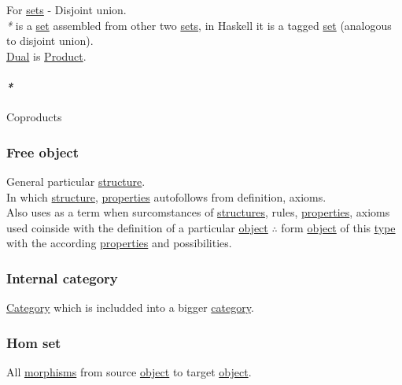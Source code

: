 \documentclass[11pt]{article}
\begin{document}
For \hyperref[org58ec608]{sets} - Disjoint union.\\

\emph{*} is a \hyperref[org1faf06d]{set} assembled from other two \hyperref[org58ec608]{sets}, in Haskell it is a tagged \hyperref[org1faf06d]{set} (analogous to disjoint union).\\

\hyperref[org28cefbe]{Dual} is \hyperref[org80a0b6e]{Product}.\\

\paragraph{\emph{*}}
\label{sec:org9b14431}

\label{org7323ed2}Coproducts\\

\subsubsection{\label{org3f07e08}Free object}
\label{sec:org372d80f}
General particular \hyperref[org8051f61]{structure}.\\
In which \hyperref[org8051f61]{structure}, \hyperref[org85fb3a1]{properties} autofollows from definition, axioms.\\

Also uses as a term when surcomstances of \hyperref[orgc87c48c]{structures}, rules, \hyperref[org85fb3a1]{properties}, axioms used coinside with the definition of a particular \hyperref[org4be0e9d]{object} \(\therefore\) form \hyperref[org4be0e9d]{object} of this \hyperref[orgc4aea2f]{type} with the according \hyperref[org85fb3a1]{properties} and possibilities.\\

\subsubsection{\label{org9335479}Internal category}
\label{sec:orgf181b9f}
\hyperref[org0450535]{Category} which is includded into a bigger \hyperref[org0450535]{category}.\\

\subsubsection{\label{org6f15cb6}Hom set}
\label{sec:orgbf68309}
All \hyperref[org6c2fa5c]{morphisms} from source \hyperref[org4be0e9d]{object} to target \hyperref[org4be0e9d]{object}.\\
\end{document}
